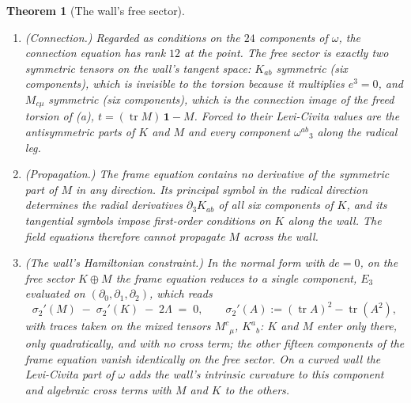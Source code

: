 \documentclass[11pt]{article}
\newtheorem{theorem}{Theorem}[section]
\theoremstyle{definition}
\begin{document}
\begin{theorem}[The wall's free sector]
\begin{enumerate}
\item[(b)] \emph{(Connection.)} Regarded as conditions on the $24$ components of $\omega$, the connection equation has rank $12$ at the point. The free sector is exactly two symmetric tensors on the wall's tangent space: $K_{ab}$ symmetric (six components), which is invisible to the torsion because it multiplies $e^3 = 0$, and $M_{c\mu}$ symmetric (six components), which is the connection image of the freed torsion of (a), $t = (\operatorname{tr}M)\,\mathbf{1} - M$. Forced to their Levi-Civita values are the antisymmetric parts of $K$ and $M$ and every component $\omega^{ab}{}_{3}$ along the radical leg.
\item[(c)] \emph{(Propagation.)} The frame equation contains no derivative of the symmetric part of $M$ in any direction. Its principal symbol in the radical direction determines the radial derivatives $\partial_3 K_{ab}$ of all six components of $K$, and its tangential symbols impose first-order conditions on $K$ along the wall. The field equations therefore cannot propagate $M$ across the wall.
\item[(d)] \emph{(The wall's Hamiltonian constraint.)} In the normal form with $de = 0$, on the free sector $K \oplus M$ the frame equation reduces to a single component, $E_3$ evaluated on $(\partial_0, \partial_1, \partial_2)$, which reads
\[
\sigma_2'(M) \;-\; \sigma_2'(K) \;-\; 2\Lambda \;=\; 0, \qquad \sigma_2'(A) := (\operatorname{tr}A)^2 - \operatorname{tr}(A^2),
\]
with traces taken on the mixed tensors $M^{c}{}_{\mu}$, $K^{a}{}_{b}$: $K$ and $M$ enter only there, only quadratically, and with no cross term; the other fifteen components of the frame equation vanish identically on the free sector. On a curved wall the Levi-Civita part of $\omega$ adds the wall's intrinsic curvature to this component and algebraic cross terms with $M$ and $K$ to the others.
\end{enumerate}

\end{theorem}
\end{document}
